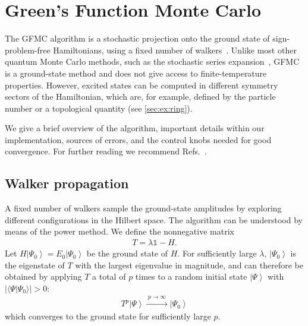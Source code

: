 \documentclass{SciPost}
\providecommand{\ket}[1]{\left|#1\right\rangle}
\begin{document}
\section{Green's Function Monte Carlo}\label{sec:gfmc}
The GFMC algorithm is a stochastic projection onto the ground state of sign-problem-free Hamiltonians, using a fixed number of walkers~\cite{trivedi_ground-state_1990,sorella_green_1998,calandra_numerical_1998,becca_quantum_2017}.
%
Unlike most other quantum Monte Carlo methods, such as the stochastic series expansion~\cite{sandvik_quantum_1991,sandvik_stochastic_1999,syljuaasen_quantum_2002}, GFMC is a ground-state method and does not give access to finite-temperature properties.
%
However, excited states can be computed in different symmetry sectors of the Hamiltonian, which are, for example, defined by the particle number or a topological quantity (see \autoref{sec:ex:ring}).

We give a brief overview of the algorithm, important details within our implementation, sources of errors, and the control knobs needed for good convergence.
%
For further reading we recommend Refs.~\cite{calandra_numerical_1998,becca_quantum_2017}.


\subsection{Walker propagation}\label{sec:gfmc:algo}
A fixed number of walkers sample the ground-state amplitudes by exploring different configurations in the Hilbert space.
%
The algorithm can be understood by means of the power method.
%
We define the nonnegative matrix
\begin{align}
	T = \lambda \mathbb{1} - H.
\end{align}
Let $H\ket{\Psi_0} = E_0\ket{\Psi_0}$ be the ground state of $H$.
%
For sufficiently large $\lambda$, $\ket{\Psi_0}$ is the eigenstate of $T$ with the largest eigenvalue in magnitude, and can therefore be obtained by applying $T$ a total of $p$ times to a random initial state $\ket{\Psi}$ with $\vert \langle \Psi\vert\Psi_0\rangle\vert>0$:
\begin{align}
	T^p\ket{\Psi} \xrightarrow{\;p\to\infty\;} \ket{\Psi_0}
\end{align}
which converges to the ground state for sufficiently large $p$.
\end{document}
